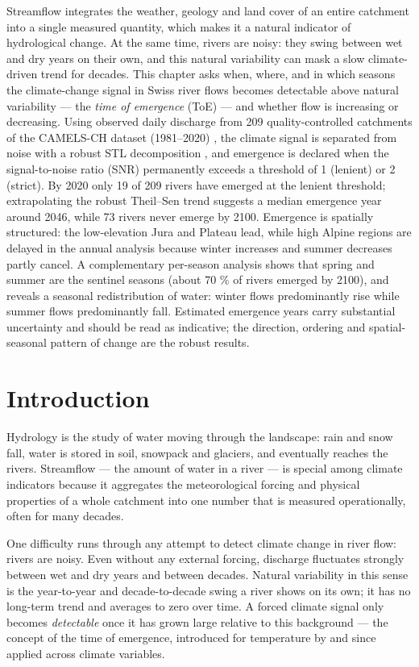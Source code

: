 \documentclass[
]{krantz}
\begin{document}
Streamflow integrates the weather, geology and land cover of an entire catchment into a single measured quantity, which makes it a natural indicator of hydrological change. At the same time, rivers are noisy: they swing between wet and dry years on their own, and this natural variability can mask a slow climate-driven trend for decades. This chapter asks when, where, and in which seasons the climate-change signal in Swiss river flows becomes detectable above natural variability --- the \emph{time of emergence} (ToE) \citep{hawkins2012} --- and whether flow is increasing or decreasing. Using observed daily discharge from 209 quality-controlled catchments of the CAMELS-CH dataset (1981--2020) \citep{hoege2023}, the climate signal is separated from noise with a robust STL decomposition \citep{cleveland1990}, and emergence is declared when the signal-to-noise ratio (SNR) permanently exceeds a threshold of 1 (lenient) or 2 (strict). By 2020 only 19 of 209 rivers have emerged at the lenient threshold; extrapolating the robust Theil--Sen trend \citep{sen1968} suggests a median emergence year around 2046, while 73 rivers never emerge by 2100. Emergence is spatially structured: the low-elevation Jura and Plateau lead, while high Alpine regions are delayed in the annual analysis because winter increases and summer decreases partly cancel. A complementary per-season analysis shows that spring and summer are the sentinel seasons (about 70 \% of rivers emerged by 2100), and reveals a seasonal redistribution of water: winter flows predominantly rise while summer flows predominantly fall. Estimated emergence years carry substantial uncertainty and should be read as indicative; the direction, ordering and spatial-seasonal pattern of change are the robust results.

\section{Introduction}\label{introduction-2}

Hydrology is the study of water moving through the landscape: rain and snow fall, water is stored in soil, snowpack and glaciers, and eventually reaches the rivers. Streamflow --- the amount of water in a river --- is special among climate indicators because it aggregates the meteorological forcing and physical properties of a whole catchment into one number that is measured operationally, often for many decades.

One difficulty runs through any attempt to detect climate change in river flow: rivers are noisy. Even without any external forcing, discharge fluctuates strongly between wet and dry years and between decades. Natural variability in this sense is the year-to-year and decade-to-decade swing a river shows on its own; it has no long-term trend and averages to zero over time. A forced climate signal only becomes \emph{detectable} once it has grown large relative to this background --- the concept of the time of emergence, introduced for temperature by \citet{hawkins2012} and since applied across climate variables.
\end{document}
